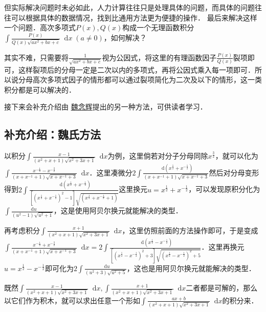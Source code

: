 \documentclass{ctexbook}
\newcommand*{\dif}{\mathop{}\!\mathrm{d}}
\begin{document}
但实际解决问题时未必如此，人力计算往往只是处理具体的问题，而具体的问题往往可以根据具体的数据情况，找到比通用方法更为便捷的操作．
最后来解决这样一个问题．高次多项式$P\left(x\right),Q\left(x\right)$构成一个无理函数积分$\int\frac{P\left(x\right)}{Q\left(x\right)\sqrt{ax^{2}+bx+c}}\dif{x}\;\left(a\ne0\right)$，如何解决？\par
其实不难，只需要将$\frac{1}{\sqrt{ax^{2}+bx+c}}$视为公因式，将这里的有理函数因子$\frac{P\left(x\right)}{Q\left(x\right)}$裂项即可，这样裂项后的分母一定是二次以内的多项式，再将公因式乘入每一项即可．所以说分母高次多项式因子的情形都可以通过裂项简化为二次及以下的情形，这一类积分都是可以解决的．\par
接下来会补充介绍由 \underline{魏念辉}提出的另一种方法，可供读者学习．\par
\subsection{补充介绍：魏氏方法}
以积分$\int\frac{x-1}{\left(x^{2}+x+1\right)\sqrt{x^{2}+3x+1}}\dif{x}$为例，这里倘若对分子分母同除$x^{\frac{3}{2}}$，就可以化为$\int\frac{x^{-\frac{1}{2}}-x^{-\frac{3}{2}}}{\left(x+x^{-1}+1\right)\sqrt{x+x^{-1}+3}}\dif{x}$．这里凑微分$2\int\frac{\dif{\left(x^{\frac{1}{2}}+x^{-\frac{1}{2}}\right)}}{\left(x+x^{-1}+1\right)\sqrt{x+x^{-1}+3}}$然后对分母变形得到$2\int\frac{\dif{\left(x^{\frac{1}{2}}+x^{-\frac{1}{2}}\right)}}{\left[\left(x^{\frac{1}{2}}+x^{-\frac{1}{2}}\right)^{2}-1\right]\sqrt{\left(x^{\frac{1}{2}}+x^{-\frac{1}{2}}+1\right)}}$这里换元$u=x^{\frac{1}{2}}+x^{-\frac{1}{2}}$，可以发现原积分化为$\int\frac{\dif{u}}{\left(u^{2}-1\right)\sqrt{u^{2}+1}}$，这是使用阿贝尔换元就能解决的类型．\par
再考虑积分$\int\frac{x+1}{\left(x^{2}+x+1\right)\sqrt{x^{2}+3x+1}}\dif{x}$，这里仿照前面的方法操作即可，于是变成$\int\frac{x^{-\frac{1}{2}}+x^{-\frac{3}{2}}}{\left(x+x^{-1}+1\right)\sqrt{x+x^{-1}+3}}\dif{x}=2\int\frac{\dif{\left(x^{\frac{1}{2}}-x^{-\frac{1}{2}}\right)}}{\left[\left(x^{\frac{1}{2}}-x^{-\frac{1}{2}}\right)^{2}+3\right]\sqrt{\left(x^{\frac{1}{2}}-x^{-\frac{1}{2}}\right)^{2}+5}}$．这里再换元$u=x^{\frac{1}{2}}-x^{-\frac{1}{2}}$即可化为$2\int\frac{\dif{u}}{\left(u^{2}+3\right)\sqrt{u^{2}+5}}$，这也是用阿贝尔换元就能解决的类型．\par
既然$\int\frac{x-1}{\left(x^{2}+x+1\right)\sqrt{x^{2}+3x+1}}\dif{x},\int\frac{x+1}{\left(x^{2}+x+1\right)\sqrt{x^{2}+3x+1}}\dif{x}$二者都是可解的，那么以它们作为积木，就可以求出任意一个形如$\int\frac{ax+b}{\left(x^{2}+x+1\right)\sqrt{x^{2}+3x+1}}\dif{x}$的积分来．\par
\end{document}
